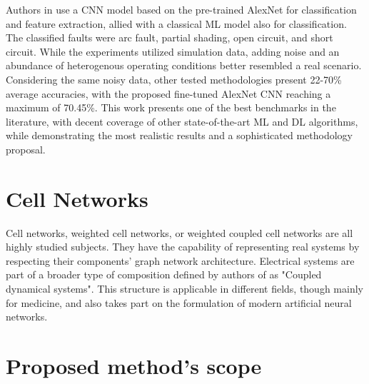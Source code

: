 Authors in \cite{Krizhevsky2012} use a CNN model based on the pre-trained AlexNet for classification and feature extraction, allied with a classical ML model also for classification. The classified faults were arc fault, partial shading, open circuit, and short circuit. While the experiments utilized simulation data, adding noise and an abundance of heterogenous operating conditions better resembled a real scenario. Considering the same noisy data, other tested methodologies present 22-70\% average accuracies, with the proposed fine-tuned AlexNet CNN reaching a maximum of 70.45\%. This work presents one of the best benchmarks in the literature, with decent coverage of other state-of-the-art ML and DL algorithms, while demonstrating the most realistic results and a sophisticated methodology proposal.

\section{Cell Networks}

Cell networks, weighted cell networks, or weighted coupled cell networks are all highly studied subjects. They have the capability of representing real systems by respecting their components' graph network architecture. Electrical systems are part of a broader type of composition defined by authors of \cite{Aguiar2010} as "Coupled dynamical systems". This structure is applicable in different fields, though mainly for medicine, and also takes part on the formulation of modern artificial neural networks.

\section{Proposed method's scope}

